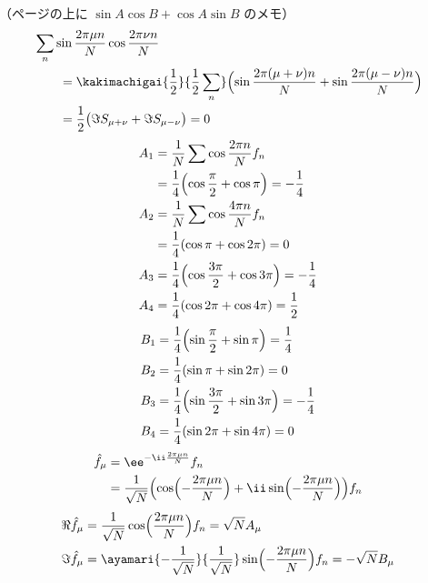 （ページの上に $\sin A\cos B+\cos A\sin B$ のメモ）
\begin{align*}
  &\sum_n\sin\frac{2\pi\mu n}{N}\cos\frac{2\pi\nu n}{N}\\
  &\qquad=\kakimachigai{\frac{1}{2}}{\frac{1}{2}\sum_n}\Bigl(\sin\frac{2\pi(\mu+\nu)n}{N}+\sin\frac{2\pi(\mu-\nu)n}{N}\Bigr)\\
  &\qquad=\frac{1}{2}\bigl(\Im S_{\mu+\nu}+\Im S_{\mu-\nu}\bigr)=0
\end{align*}
\begin{align*}
  A_1&=\frac{1}{N}\sum\cos\frac{2\pi n}{N}f_n\\
  &=\frac{1}{4}\Bigl(\cos\frac{\pi}{2}+\cos\pi\Bigr)=-\frac{1}{4}\\
  A_2&=\frac{1}{N}\sum\cos\frac{4\pi n}{N}f_n\\
  &=\frac{1}{4}(\cos\pi+\cos2\pi)=0\\
  A_3&=\frac{1}{4}\Bigl(\cos\frac{3\pi}{2}+\cos3\pi\Bigr)=-\frac{1}{4}\\
  A_4&=\frac{1}{4}(\cos2\pi+\cos4\pi)=\frac{1}{2}
\end{align*}
\begin{align*}
  B_1&=\frac{1}{4}\Bigl(\sin\frac{\pi}{2}+\sin\pi\Bigr)=\frac{1}{4}\\
  B_2&=\frac{1}{4}(\sin\pi+\sin2\pi)=0\\
  B_3&=\frac{1}{4}\Bigl(\sin\frac{3\pi}{2}+\sin3\pi\Bigr)=-\frac{1}{4}\\
  B_4&=\frac{1}{4}(\sin2\pi+\sin4\pi)=0
\end{align*}
\begin{align*}
  \hat{f}_{\mu}&=\ee^{-\ii\frac{2\pi\mu n}{N}}f_n\\
  &=\frac{1}{\sqrt{N}}\Bigl(\cos\Bigl(-\frac{2\pi\mu n}{N}\Bigr)+\ii\sin\Bigl(-\frac{2\pi\mu n}{N}\Bigr)\Bigr)f_n
\end{align*}
\begin{align*}
  \Re\hat{f}_{\mu}&=\frac{1}{\sqrt{N}}\cos\Bigl(\frac{2\pi\mu n}{N}\Bigr)f_n=\sqrt{N}A_{\mu}\\
  \Im\hat{f}_{\mu}&=\ayamari{-\frac{1}{\sqrt{N}}}{\frac{1}{\sqrt{N}}}\sin\Bigl(-\frac{2\pi\mu n}{N}\Bigr)f_n=-\sqrt{N}B_{\mu}
\end{align*}
